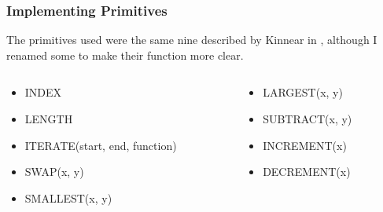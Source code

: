 \documentclass{beamer}
\begin{document}
		\begin{frame}
			
			\frametitle{Implementing Primitives}
			
			The primitives used were the same nine described by Kinnear in \cite{kinnear_evolving_1993}, although I renamed some to make their function more clear.
			
			\begin{columns}[T]
				
				\begin{column}{0.5\textwidth}
					
					\begin{itemize}
						\item INDEX
						\item LENGTH
						\item ITERATE(start, end, function)
						\item SWAP(x, y)
						\item SMALLEST(x, y)
					\end{itemize}
					
				\end{column}
			
				\begin{column}{0.5\textwidth}
					
					\begin{itemize}
					\item LARGEST(x, y)
					\item SUBTRACT(x, y)
					\item INCREMENT(x)
					\item DECREMENT(x)
					\end{itemize}
					
				\end{column}
				
			\end{columns}
	
		\end{frame}
	
\end{document}
